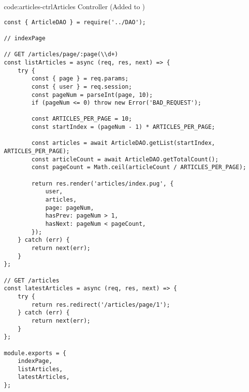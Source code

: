 \begin{codeenv}{code:articles-ctrl}{Articles Controller (Added to )}\begin{verbatim}
const { ArticleDAO } = require('../DAO');

// indexPage

// GET /articles/page/:page(\\d+)
const listArticles = async (req, res, next) => {
    try {
        const { page } = req.params;
        const { user } = req.session;
        const pageNum = parseInt(page, 10);
        if (pageNum <= 0) throw new Error('BAD_REQUEST');

        const ARTICLES_PER_PAGE = 10;
        const startIndex = (pageNum - 1) * ARTICLES_PER_PAGE;

        const articles = await ArticleDAO.getList(startIndex, ARTICLES_PER_PAGE);
        const articleCount = await ArticleDAO.getTotalCount();
        const pageCount = Math.ceil(articleCount / ARTICLES_PER_PAGE);

        return res.render('articles/index.pug', {
            user,
            articles,
            page: pageNum,
            hasPrev: pageNum > 1,
            hasNext: pageNum < pageCount,
        });
    } catch (err) {
        return next(err);
    }
};

// GET /articles
const latestArticles = async (req, res, next) => {
    try {
        return res.redirect('/articles/page/1');
    } catch (err) {
        return next(err);
    }
};

module.exports = {
    indexPage,
    listArticles,
    latestArticles,
};
\end{verbatim}
\end{codeenv}
